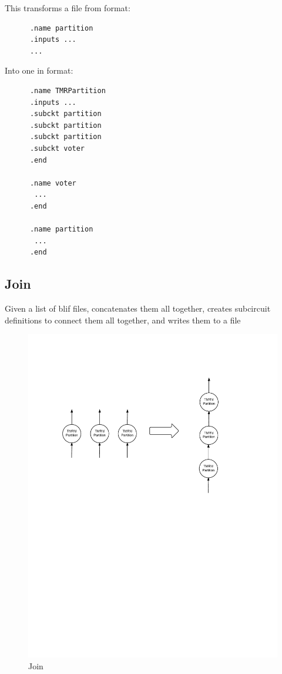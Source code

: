 \documentclass[12pt,final,oneside]{dwThesis} %
\begin{document}
   This transforms a file from format: 
   \begin{lstlisting}
      .name partition
      .inputs ... 
      ... 
   \end{lstlisting}
   Into one in format:

   \begin{lstlisting}
      .name TMRPartition
      .inputs ... 
      .subckt partition
      .subckt partition
      .subckt partition
      .subckt voter
      .end

      .name voter
       ... 
      .end
       
      .name partition
       ... 
      .end 
   \end{lstlisting}


   \newpage 
   \subsection{Join}
   \label{algJoin} Given a list of blif files,
   concatenates them all together, creates subcircuit definitions to connect
   them all together, and writes them to a file 
   \begin{figure}

      \begin{center}

         \includegraphics[width=\linewidth]{images/Join.pdf} \caption{Join}
         \label{imJoin} 
      \end{center}

   \end{figure}
\end{document}
